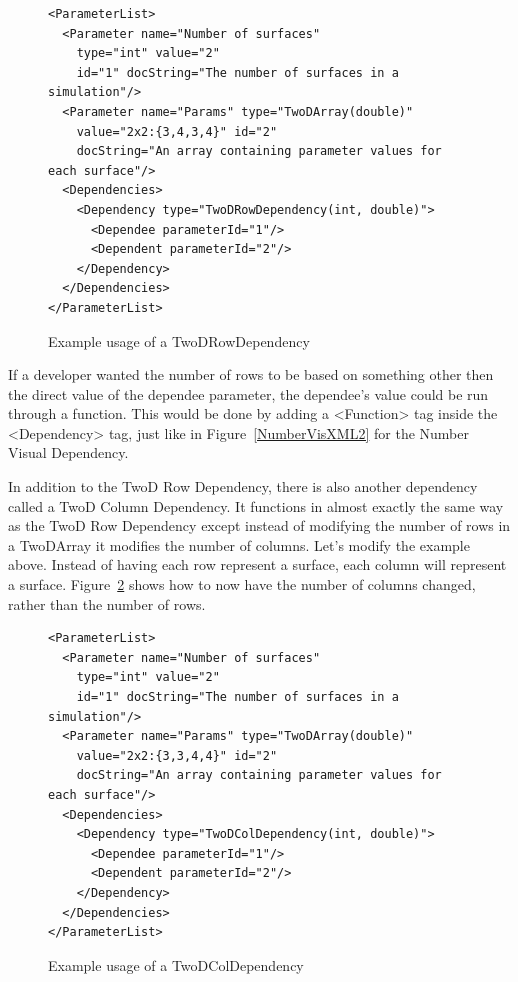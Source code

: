 \begin{figure}
\centering
{\footnotesize
\begin{Verbatim}
<ParameterList>
  <Parameter name="Number of surfaces" 
    type="int" value="2"
    id="1" docString="The number of surfaces in a simulation"/>
  <Parameter name="Params" type="TwoDArray(double)"
    value="2x2:{3,4,3,4}" id="2" 
    docString="An array containing parameter values for each surface"/>
  <Dependencies>
    <Dependency type="TwoDRowDependency(int, double)">
      <Dependee parameterId="1"/>
      <Dependent parameterId="2"/>
    </Dependency>
  </Dependencies>
</ParameterList>
\end{Verbatim}
}
\caption{Example usage of a TwoDRowDependency}
\label{TwoDRowXML}
\end{figure}

If a developer wanted the number of rows to be based on something other then the direct value of the dependee parameter, the dependee's value could be
run through a function. 
This would be done by adding a <Function> tag inside the <Dependency> tag, just like in Figure~\ref{NumberVisXML2} for the Number Visual Dependency.

In addition to the TwoD Row Dependency, there is also another dependency called a TwoD Column Dependency. It functions in almost exactly the same way
as the TwoD Row Dependency except instead of modifying the number of rows in a TwoDArray it modifies the number of columns. Let's modify the example above.
Instead of having each row represent a surface, each column will represent a surface. Figure~\ref{TwoDColXML} shows how to now have the number of columns
changed, rather than the number of rows.
\begin{figure}
\centering
{\footnotesize
\begin{Verbatim}
<ParameterList>
  <Parameter name="Number of surfaces" 
    type="int" value="2"
    id="1" docString="The number of surfaces in a simulation"/>
  <Parameter name="Params" type="TwoDArray(double)"
    value="2x2:{3,3,4,4}" id="2" 
    docString="An array containing parameter values for each surface"/>
  <Dependencies>
    <Dependency type="TwoDColDependency(int, double)">
      <Dependee parameterId="1"/>
      <Dependent parameterId="2"/>
    </Dependency>
  </Dependencies>
</ParameterList>
\end{Verbatim}
}
\caption{Example usage of a TwoDColDependency}
\label{TwoDColXML}
\end{figure}

